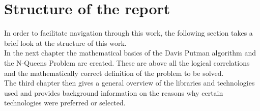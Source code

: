 \section{Structure of the report}
In order to facilitate navigation through this work, the following section takes a brief look at the structure of this work. 
\\
In the next chapter the mathematical basics of the Davis Putman algorithm and the N-Queens Problem are created. These are above all the logical correlations and the mathematically correct definition of the problem to be solved. 
\\
The third chapter then gives a general overview of the libraries and technologies used and provides background information on the reasons why certain technologies were preferred or selected.
